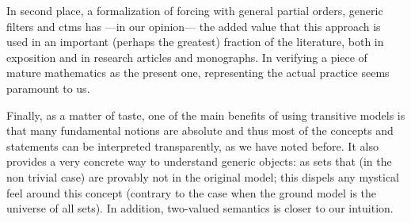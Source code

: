 In second place, a formalization of forcing with general partial
orders, generic filters and  ctms has ---in our opinion--- the added value
that this approach is used in an important (perhaps the greatest)
fraction of the literature, both in exposition and in research
articles and monographs. In verifying a piece of mature mathematics as the
present one, representing the actual practice seems paramount to us.
 
Finally, as a matter of taste, one of the main benefits of using transitive
models is that many fundamental notions are absolute and thus most of
the concepts and statements can be interpreted transparently, as we
have noted before. It
also provides a very concrete way to understand generic objects: as
sets that (in the non trivial case) are provably not in the original
model; this dispels any mystical feel around this concept (contrary
to the case when the ground model is the universe of all sets). In
addition, two-valued semantics is closer to our intuition.


